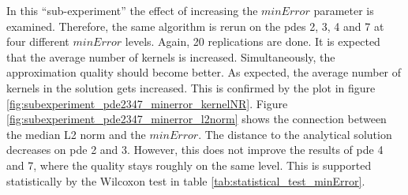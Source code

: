 \documentclass[./\jobname.tex]{subfiles}
\begin{document}
In this ``sub-experiment'' the effect of increasing the $minError$ parameter is examined. Therefore, the same algorithm is rerun on the \gls{pde}s 2, 3, 4 and 7 at four different $minError$ levels. Again, 20 replications are done. It is expected that the average number of kernels is increased. Simultaneously, the approximation quality should become better. As expected, the average number of kernels in the solution gets increased. This is confirmed by the plot in figure \ref{fig:subexperiment_pde2347_minerror_kernelNR}. Figure \ref{fig:subexperiment_pde2347_minerror_l2norm} shows the connection between the median L2 norm and the $minError$. The distance to the analytical solution decreases on \gls{pde} 2 and 3. However, this does not improve the results of \gls{pde} 4 and 7, where the quality stays roughly on the same level. This is supported statistically by the Wilcoxon test in table \ref{tab:statistical_test_minError}.
\end{document}
